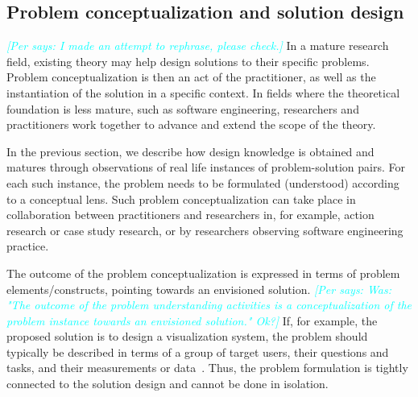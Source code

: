 \documentclass[graybox]{svmult}
\newcommand{\peggy}[1]{\textcolor{blue}{{\it [Peggy says: #1]}}}
\newcommand{\per}[1]{\textcolor{cyan}{{\it [Per says: #1]}}}
\newcommand{\peggy}[1]{}
\newcommand{\per}[1]{}
\begin{document}
\subsection{Problem conceptualization and solution design}


\per{I made an attempt to rephrase, please check.}
In a mature research field, existing theory may help design solutions to their specific problems. Problem conceptualization is then an act of the practitioner, as well as the instantiation of the solution in a specific context. In fields where the theoretical foundation is less mature, such as software engineering, researchers and practitioners work together to advance and extend the scope of the theory. 

 In the previous section, we describe how design knowledge is obtained and matures through observations of real life instances of problem-solution pairs. For each such instance, the problem needs to be formulated (understood) according to a conceptual lens. Such problem conceptualization can take place in collaboration between practitioners and researchers in, for example, action research or case study research, or by researchers observing software engineering practice.


The outcome of the problem conceptualization is expressed in terms of problem elements/constructs, pointing towards an envisioned solution. \per{Was: "The outcome of the problem understanding activities is a conceptualization of the problem instance towards an envisioned solution." Ok?} If, for example, the proposed solution is to design a visualization system, the problem should typically be described in terms of a group of target users, their questions and tasks, and their measurements or data~\cite{meyer_nested_2015}. Thus, the problem formulation is tightly connected to the solution design and cannot be done in isolation. 
\end{document}
